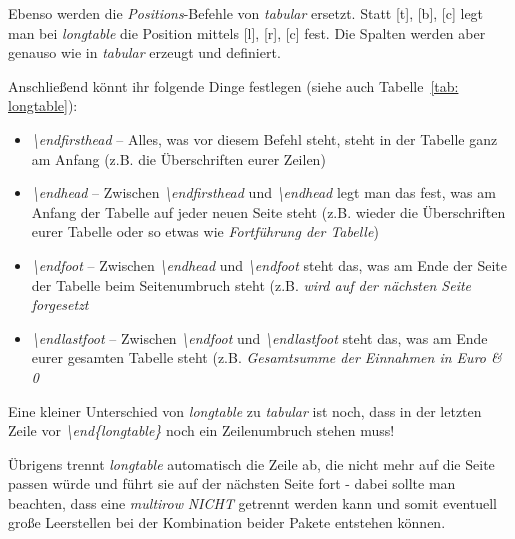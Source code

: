 Ebenso werden die \emph{Positions}-Befehle von \emph{tabular} ersetzt. Statt [t], [b], [c] legt man bei \emph{longtable} die Position mittels [l], [r], [c] fest. Die Spalten werden aber genauso wie in \emph{tabular} erzeugt und definiert.%

Anschließend könnt ihr folgende Dinge festlegen (siehe auch Tabelle~\ref{tab: longtable}):\\
\begin{itemize}
\item \emph{\textbackslash endfirsthead} -- Alles, was vor diesem Befehl steht, steht in der Tabelle ganz am Anfang (z.B. die Überschriften eurer Zeilen)
\item \emph{\textbackslash endhead} -- Zwischen \emph{\textbackslash endfirsthead} und \emph{\textbackslash endhead} legt man das fest, was am Anfang der Tabelle auf jeder neuen Seite steht (z.B. wieder die Überschriften eurer Tabelle oder so etwas wie \emph{Fortführung der Tabelle})
\item \emph{\textbackslash endfoot} -- Zwischen \emph{\textbackslash endhead} und \emph{\textbackslash endfoot} steht das, was am Ende der Seite der Tabelle beim Seitenumbruch steht (z.B. \emph{wird auf der nächsten Seite forgesetzt}
\item \emph{\textbackslash endlastfoot} -- Zwischen \emph{\textbackslash endfoot} und \emph{\textbackslash endlastfoot} steht das, was am Ende eurer gesamten Tabelle steht (z.B. \emph{Gesamtsumme der Einnahmen in Euro \& 0 }
\end{itemize}%

Eine kleiner Unterschied von \emph{longtable} zu \emph{tabular} ist noch, dass in der letzten Zeile vor \emph{\textbackslash end\{longtable\}} noch ein Zeilenumbruch stehen muss!

Übrigens trennt \emph{longtable} automatisch die Zeile ab, die nicht mehr auf die Seite passen würde und führt sie auf der nächsten Seite fort - dabei sollte man beachten, dass eine \emph{multirow} \emph{\textsc{NICHT}} getrennt werden kann und somit eventuell große Leerstellen bei der Kombination beider Pakete entstehen können.%

